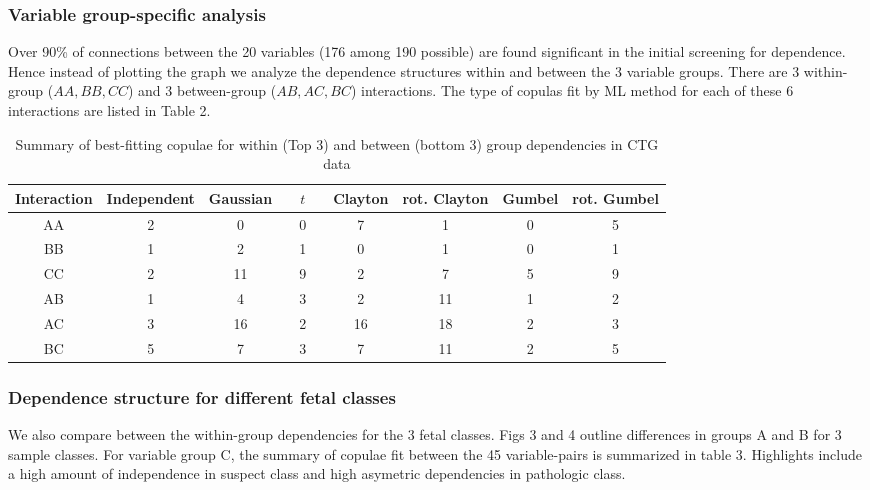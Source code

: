 \documentclass[11pt]{llncs}
\begin{document}
\subsubsection{Variable group-specific analysis}
Over 90\% of connections between the 20 variables (176 among 190 possible) are found significant in the initial screening for dependence. Hence instead of plotting the graph we analyze the dependence structures within and between the 3 variable groups. There are 3 within-group ($AA, BB, CC$) and 3 between-group ($AB, AC, BC$) interactions. The type of copulas fit by ML method for each of these 6 interactions are listed in Table 2.

\begin{table}[ht]\centering
    \begin{tabular}{|c||c|c|c|c|c|c|c|}
    \hline
    Interaction & Independent & Gaussian & $\quad t\quad$ & Clayton & rot. Clayton & Gumbel & rot. Gumbel \\ \hline
    AA                  & 2           & 0        & 0 & 7       & 1               & 0      & 5              \\
    BB                  & 1           & 2        & 1 & 0       & 1               & 0      & 1              \\
    CC                  & 2           & 11       & 9 & 2       & 7               & 5      & 9              \\ \hline\hline
    AB                  & 1           & 4        & 3 & 2       & 11              & 1      & 2              \\
    AC                  & 3           & 16       & 2 & 16      & 18              & 2      & 3              \\
    BC                  & 5           & 7        & 3 & 7       & 11              & 2      & 5              \\ \hline
    \end{tabular}
    \caption{Summary of best-fitting copulae for within (Top 3) and between (bottom 3) group dependencies in CTG data}
\end{table}

\subsubsection{Dependence structure for different fetal classes} We also compare between the within-group dependencies for the 3 fetal classes. Figs 3 and 4 outline differences in groups A and B for 3 sample classes. For variable group C, the summary of copulae fit between the 45 variable-pairs is summarized in table 3. Highlights include a high amount of independence in suspect class and high asymetric dependencies in pathologic class.
\end{document}
